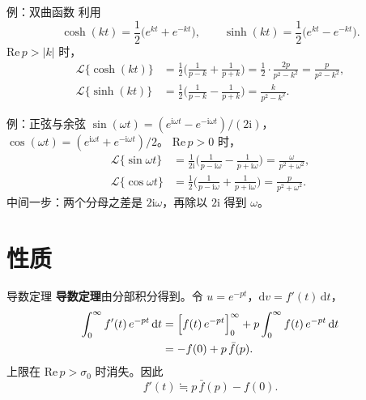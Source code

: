 \documentclass[fontset=windows, chinese, 10pt, xcolor=dvipsnames]{beamer}
\begin{document}
\begin{frame}{例：双曲函数}
  利用
  \begin{equation*}
    \cosh(kt)=\frac12\bigl(e^{kt}+e^{-kt}\bigr),
    \qquad
    \sinh(kt)=\frac12\bigl(e^{kt}-e^{-kt}\bigr).
  \end{equation*}
  $\mathrm{Re}\,p>|k|$ 时，
  \begin{align*}
    \mathcal{L}\{\cosh(kt)\}
    &=\frac12\Biggl(\frac{1}{p-k}+\frac{1}{p+k}\Biggr)
     =\frac12\cdot\frac{2p}{p^2-k^2}
     =\frac{p}{p^2-k^2},\\[0.4em]
    \mathcal{L}\{\sinh(kt)\}
    &=\frac12\Biggl(\frac{1}{p-k}-\frac{1}{p+k}\Biggr)
     =\frac{k}{p^2-k^2}.
  \end{align*}
\end{frame}

\begin{frame}{例：正弦与余弦}
  $\sin(\omega t)=(e^{\mathrm{i}\omega t}-e^{-\mathrm{i}\omega t})/(2\mathrm{i})$，
  $\cos(\omega t)=(e^{\mathrm{i}\omega t}+e^{-\mathrm{i}\omega t})/2$。
  $\mathrm{Re}\,p>0$ 时，
  \begin{align*}
    \mathcal{L}\{\sin\omega t\}
    &=\frac{1}{2\mathrm{i}}
      \Biggl(\frac{1}{p-\mathrm{i}\omega}-\frac{1}{p+\mathrm{i}\omega}\Biggr)
     =\frac{\omega}{p^2+\omega^2},\\[0.4em]
    \mathcal{L}\{\cos\omega t\}
    &=\frac12
      \Biggl(\frac{1}{p-\mathrm{i}\omega}+\frac{1}{p+\mathrm{i}\omega}\Biggr)
     =\frac{p}{p^2+\omega^2}.
  \end{align*}
  中间一步：两个分母之差是 $2\mathrm{i}\omega$，再除以 $2\mathrm{i}$ 得到 $\omega$。
\end{frame}

\section{性质}

\begin{frame}{导数定理}
  \textbf{导数定理}由分部积分得到。令 $u=e^{-pt}$，$\mathrm{d}v=f'(t)\,\mathrm{d}t$，
  \begin{align*}
    \int_0^{\infty} f'(t)\,e^{-pt}\,\mathrm{d}t
    &=\Bigl[f(t)\,e^{-pt}\Bigr]_0^{\infty}
      +p\int_0^{\infty} f(t)\,e^{-pt}\,\mathrm{d}t \\
    &=-f(0)+p\,\bar f(p).
  \end{align*}
  上限在 $\mathrm{Re}\,p>\sigma_0$ 时消失。因此
  \begin{equation*}
    f'(t)\fallingdotseq p\,\bar f(p)-f(0).
  \end{equation*}
\end{frame}
\end{document}
